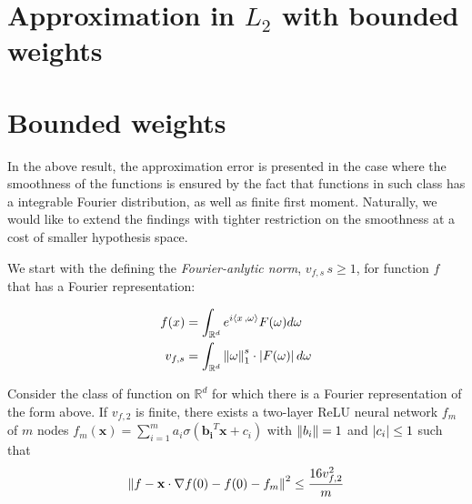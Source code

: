 \section*{Approximation in $L_2$ with bounded weights}


\section{Bounded weights}



In the above result, the approximation error is presented in the case where the
smoothness of the functions is ensured by the fact that functions in such class
has a integrable Fourier distribution, as well as finite first moment.
Naturally, we would like to extend the findings with tighter restriction on the
smoothness at a cost of smaller hypothesis space.

We start with the defining the \textit{Fourier-anlytic norm}, $v_{f, s}\,
s\geq1$, for function $f$ that has a Fourier representation:

\begin{align}
    f(x)     & = \int_{\mathbb{R}^d} e^{i\left\langle x\, , \omega \right\rangle} F(\omega) d\omega \label{eq:fourier_rep}           \\
    v_{f, s} & = \int_{\mathbb{R}^d} \left\| \omega \right\|_1^s \cdot \left| F(\omega) \right| d\omega \label{eq:fourier_norm}
\end{align}


\begin{theorem}\label{thm:appr_f2}
    Consider the class of function on $\mathbb{R}^d$ for which there is a
    Fourier representation of the form above. If $v_{f, 2}$ is finite, there
    exists a two-layer ReLU neural network $f_m$ of $m$ nodes $f_m(\mathbf{x})
        = \sum_{i=1}^m a_i \sigma(\mathbf{b_i}^T\mathbf{x} + c_i)$ with $\left\| b_i \right\|
        = 1$ and $\left| c_i \right|\leq 1$ such that
    \begin{equation}
        \left\| f
            - \mathbf{x} \cdot \nabla f(0)
            - f(0)
            - f_m \right\|^2 \leq \frac{16 v_{f, 2}^2}{m}
    \end{equation}
\end{theorem}

